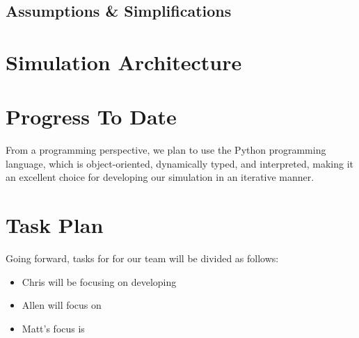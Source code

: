 \documentclass[12pt]{article}
\begin{document}
\subsection{Assumptions \& Simplifications}

\section{Simulation Architecture}
\label{sec:architecture}

\section{Progress To Date}
\label{sec:progress}

From a programming perspective, we plan to use the Python programming language,
which is object-oriented, dynamically typed, and interpreted, making it an
excellent choice for developing our simulation in an iterative manner.

\section{Task Plan}
\label{sec:taskplan}

Going forward, tasks for for our team will be divided as follows:

\begin{itemize}
  \item Chris will be focusing on developing
  \item Allen will focus on
  \item Matt's focus is
\end{itemize}

\clearpage
{}

\end{document}
